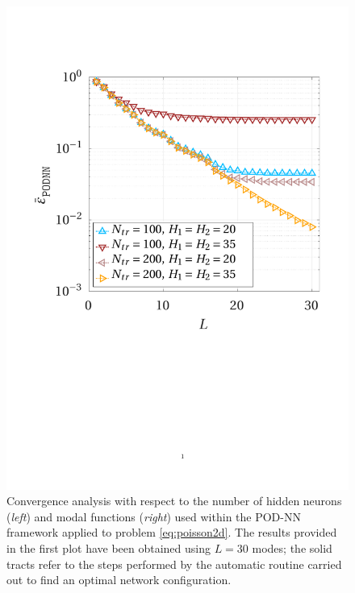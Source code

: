 \documentclass{elsarticle}
\numberwithin{equation}{section}
\theoremstyle{theorem}
\theoremstyle{definition}
\theoremstyle{remark}
\theoremstyle{proposition}
\numberwithin{figure}{section}
\begin{document}
\begin{figure}[t!]
			\includegraphics[scale = 0.385, trim = {1.5cm 9.8cm 1.5cm 3.8cm}, clip]{poisson2d_3_nn_comparison}
			
			\vspace*{-0.1cm}
						
			\caption{Convergence analysis with respect to the number of hidden neurons (\emph{left}) and modal functions (\emph{right}) used within the POD-NN framework applied to problem \eqref{eq:poisson2d}. The results provided in the first plot have been obtained using $L = 30$ modes; the solid tracts refer to the steps performed by the automatic routine carried out to find an optimal network configuration.}
			\label{fig:poisson2d-fig4}
		\end{figure}	
		
\end{document}
